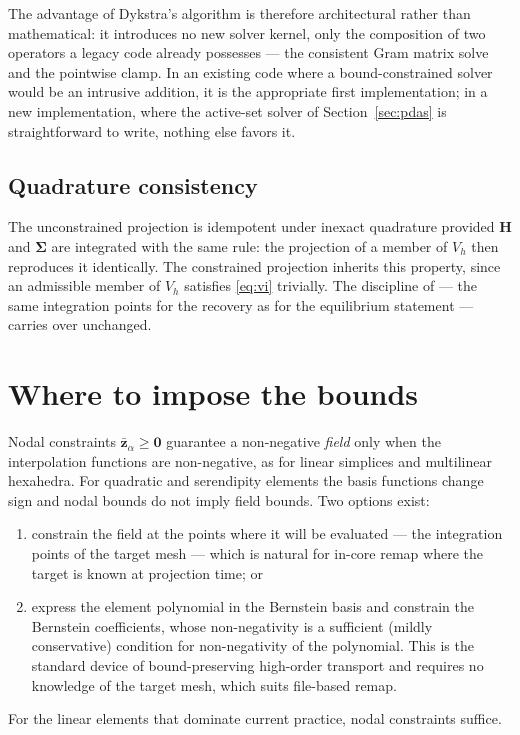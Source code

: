 \documentclass[11pt]{article}
\newcommand{\bs}[1]{\boldsymbol{#1}}
\begin{document}
The advantage of Dykstra's algorithm is therefore architectural rather
than mathematical: it introduces no new solver kernel, only the
composition of two operators a legacy code already possesses --- the
consistent Gram matrix solve and the pointwise clamp. In an existing
code where a bound-constrained solver would be an intrusive addition,
it is the appropriate first implementation; in a new implementation,
where the active-set solver of Section~\ref{sec:pdas} is
straightforward to write, nothing else favors it.

\subsection{Quadrature consistency}

The unconstrained projection is idempotent under inexact quadrature
provided $\bs{H}$ and $\bs{\Sigma}$ are integrated with the same rule:
the projection of a member of $V_h$ then reproduces it identically. The
constrained projection inherits this property, since an admissible member
of $V_h$ satisfies \eqref{eq:vi} trivially. The discipline of
\cite{mota2013} --- the same integration points for the recovery as for
the equilibrium statement --- carries over unchanged.

\section{Where to impose the bounds}
\label{sec:where}

Nodal constraints $\bar{\bs{z}}_\alpha \geq \bs{0}$ guarantee a
non-negative \emph{field} only when the interpolation functions are
non-negative, as for linear simplices and multilinear hexahedra. For
quadratic and serendipity elements the basis functions change sign and
nodal bounds do not imply field bounds. Two options exist:
\begin{enumerate}[nosep]
\item constrain the field at the points where it will be evaluated ---
the integration points of the target mesh --- which is natural for
in-core remap where the target is known at projection time; or
\item express the element polynomial in the Bernstein basis and constrain
the Bernstein coefficients, whose non-negativity is a sufficient (mildly
conservative) condition for non-negativity of the polynomial. This is the
standard device of bound-preserving high-order transport and requires no
knowledge of the target mesh, which suits file-based remap.
\end{enumerate}
For the linear elements that dominate current practice, nodal constraints
suffice.
\end{document}

